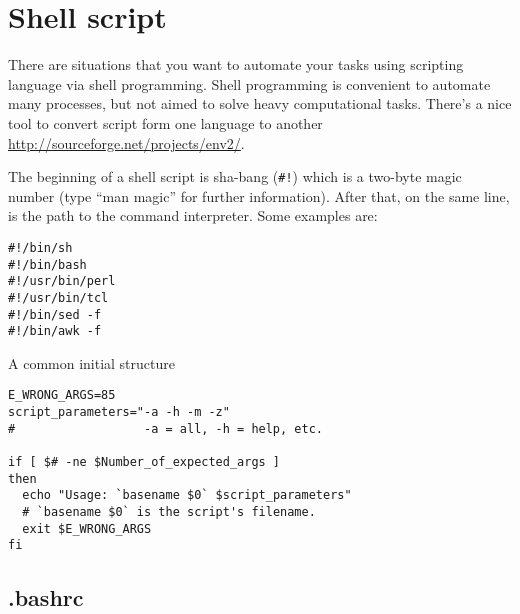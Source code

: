 \chapter{Shell script}
\label{chap:shell_and_shell_scripting}

There are situations that you want to automate your tasks using
scripting language via shell programming. Shell programming is convenient to
automate many processes, but not aimed to solve heavy computational tasks.
There's a nice tool to convert script form one language to another
\url{http://sourceforge.net/projects/env2/}.

The beginning of a shell script is sha-bang (\verb.#!.) which is a two-byte
magic number (type ``man magic'' for further information). After that, on the
same line, is the path to the command interpreter. Some examples are:
\begin{verbatim}
#!/bin/sh
#!/bin/bash
#!/usr/bin/perl
#!/usr/bin/tcl
#!/bin/sed -f
#!/bin/awk -f 
\end{verbatim}

A common initial structure
\begin{verbatim}
E_WRONG_ARGS=85
script_parameters="-a -h -m -z"
#                  -a = all, -h = help, etc.

if [ $# -ne $Number_of_expected_args ]
then
  echo "Usage: `basename $0` $script_parameters"
  # `basename $0` is the script's filename.
  exit $E_WRONG_ARGS
fi
\end{verbatim}

\section{.bashrc}
\label{sec:bashrc}

